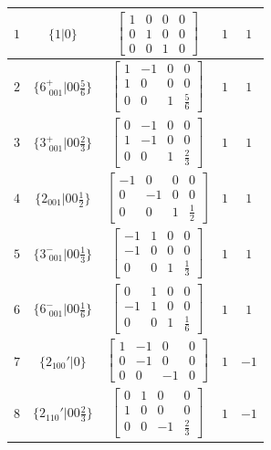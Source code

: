 \documentclass[fleqn,8pt]{jsarticle}
\begin{document}
\begin{longtable}{ccccc}
$ 1 $ & $ \{1|0\} $ & $ \begin{bmatrix} 1 & 0 & 0 & 0 \\ 0 & 1 & 0 & 0 \\ 0 & 0 & 1 & 0 \end{bmatrix} $ & $ 1 $ & $ 1 $ \\ \hline
$ 2 $ & $ \{6^{+}_{\,\,001}|0 0 \frac{5}{6}\} $ & $ \begin{bmatrix} 1 & -1 & 0 & 0 \\ 1 & 0 & 0 & 0 \\ 0 & 0 & 1 & \frac{5}{6} \end{bmatrix} $ & $ 1 $ & $ 1 $ \\ \hline
$ 3 $ & $ \{3^{+}_{\,\,001}|0 0 \frac{2}{3}\} $ & $ \begin{bmatrix} 0 & -1 & 0 & 0 \\ 1 & -1 & 0 & 0 \\ 0 & 0 & 1 & \frac{2}{3} \end{bmatrix} $ & $ 1 $ & $ 1 $ \\ \hline
$ 4 $ & $ \{2{}_{001}|0 0 \frac{1}{2}\} $ & $ \begin{bmatrix} -1 & 0 & 0 & 0 \\ 0 & -1 & 0 & 0 \\ 0 & 0 & 1 & \frac{1}{2} \end{bmatrix} $ & $ 1 $ & $ 1 $ \\ \hline
$ 5 $ & $ \{3^{-}_{\,\,001}|0 0 \frac{1}{3}\} $ & $ \begin{bmatrix} -1 & 1 & 0 & 0 \\ -1 & 0 & 0 & 0 \\ 0 & 0 & 1 & \frac{1}{3} \end{bmatrix} $ & $ 1 $ & $ 1 $ \\ \hline
$ 6 $ & $ \{6^{-}_{\,\,001}|0 0 \frac{1}{6}\} $ & $ \begin{bmatrix} 0 & 1 & 0 & 0 \\ -1 & 1 & 0 & 0 \\ 0 & 0 & 1 & \frac{1}{6} \end{bmatrix} $ & $ 1 $ & $ 1 $ \\ \hline
$ 7 $ & $ \{2{}_{100}{}'|0\} $ & $ \begin{bmatrix} 1 & -1 & 0 & 0 \\ 0 & -1 & 0 & 0 \\ 0 & 0 & -1 & 0 \end{bmatrix} $ & $ 1 $ & $ -1 $ \\ \hline
$ 8 $ & $ \{2{}_{110}{}'|0 0 \frac{2}{3}\} $ & $ \begin{bmatrix} 0 & 1 & 0 & 0 \\ 1 & 0 & 0 & 0 \\ 0 & 0 & -1 & \frac{2}{3} \end{bmatrix} $ & $ 1 $ & $ -1 $ \\ \hline

\end{longtable}
\end{document}
